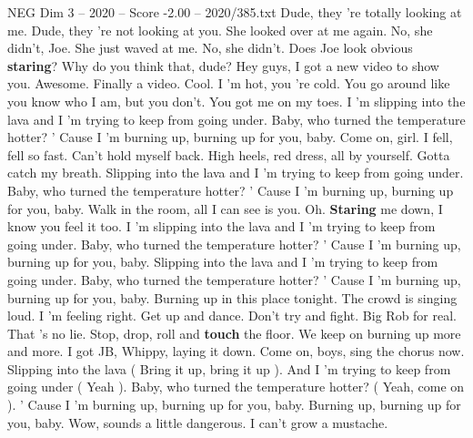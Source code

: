 \begin{textsample}{NEG Dim 3 – 2020 – Score -2.00 – 2020/385.txt}  \label{ex:f3_neg_032}
Dude, they 're totally looking at me.
Dude, they 're not looking at you.
She looked over at me again.
No, she didn't, Joe.
She just waved at me.
No, she didn't.
Does Joe look obvious \textbf{staring}?
Why do you think that, dude?
Hey guys, I got a new video to show you.
Awesome.
Finally a video.
Cool.
I 'm hot, you 're cold.
You go around like you know who I am, but you don't.
You got me on my toes.
I 'm slipping into the lava and I 'm trying to keep from going under.
Baby, who turned the temperature hotter? ' Cause I 'm burning up, burning up for you, baby.
Come on, girl.
I fell, fell so fast.
Can't hold myself back.
High heels, red dress, all by yourself.
Gotta catch my breath.
Slipping into the lava and I 'm trying to keep from going under.
Baby, who turned the temperature hotter? ' Cause I 'm burning up, burning up for you, baby.
Walk in the room, all I can see is you.
Oh. \textbf{Staring} me down, I know you feel it too.
I 'm slipping into the lava and I 'm trying to keep from going under.
Baby, who turned the temperature hotter? ' Cause I 'm burning up, burning up for you, baby.
Slipping into the lava and I 'm trying to keep from going under.
Baby, who turned the temperature hotter? ' Cause I 'm burning up, burning up for you, baby.
Burning up in this place tonight.
The crowd is singing loud.
I 'm feeling right.
Get up and dance.
Don't try and fight.
Big Rob for real.
That 's no lie.
Stop, drop, roll and \textbf{touch} the floor.
We keep on burning up more and more.
I got JB, Whippy, laying it down.
Come on, boys, sing the chorus now.
Slipping into the lava ( Bring it up, bring it up ).
And I 'm trying to keep from going under ( Yeah ).
Baby, who turned the temperature hotter? ( Yeah, come on ). ' Cause I 'm burning up, burning up for you, baby.
Burning up, burning up for you, baby.
Wow, sounds a little dangerous.
I can't grow a mustache.

\end{textsample}
